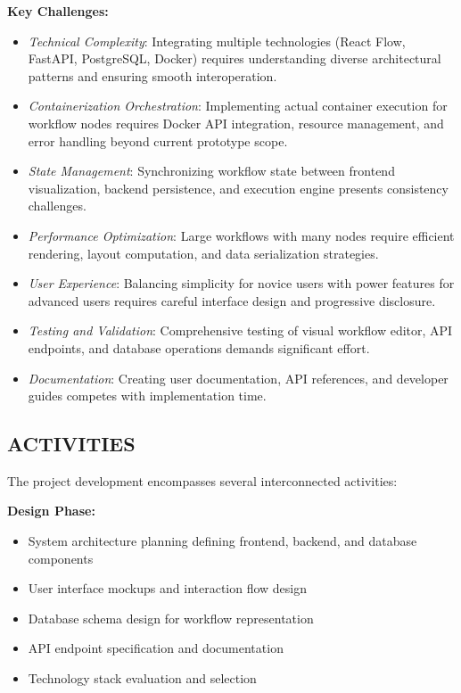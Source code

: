 \documentclass[12pt]{article}
\begin{document}
\textbf{Key Challenges:}
\begin{itemize}
    \item \textit{Technical Complexity}: Integrating multiple technologies (React Flow, FastAPI, PostgreSQL, Docker) requires understanding diverse architectural patterns and ensuring smooth interoperation.
    
    \item \textit{Containerization Orchestration}: Implementing actual container execution for workflow nodes requires Docker API integration, resource management, and error handling beyond current prototype scope.
    
    \item \textit{State Management}: Synchronizing workflow state between frontend visualization, backend persistence, and execution engine presents consistency challenges.
    
    \item \textit{Performance Optimization}: Large workflows with many nodes require efficient rendering, layout computation, and data serialization strategies.
    
    \item \textit{User Experience}: Balancing simplicity for novice users with power features for advanced users requires careful interface design and progressive disclosure.
    
    \item \textit{Testing and Validation}: Comprehensive testing of visual workflow editor, API endpoints, and database operations demands significant effort.
    
    \item \textit{Documentation}: Creating user documentation, API references, and developer guides competes with implementation time.
\end{itemize}

\subsection{ACTIVITIES}

The project development encompasses several interconnected activities:

\textbf{Design Phase:}
\begin{itemize}
    \item System architecture planning defining frontend, backend, and database components
    \item User interface mockups and interaction flow design
    \item Database schema design for workflow representation
    \item API endpoint specification and documentation
    \item Technology stack evaluation and selection
\end{itemize}
\end{document}
